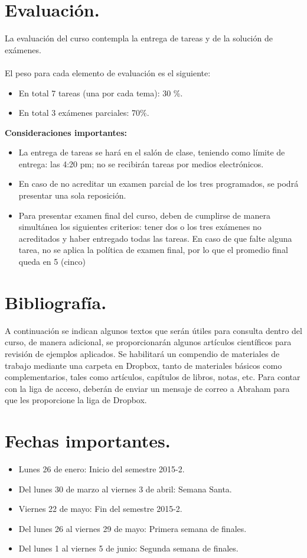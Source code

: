 \documentclass[12pt]{article}
\begin{document}
\section{Evaluación.}
La evaluación del curso contempla la entrega de tareas y de la solución de exámenes.
\\
\\
El peso para cada elemento de evaluación es el siguiente:
\begin{itemize}
\setlength{\itemsep}{0mm}
\item En total 7 tareas (una por cada tema): \hspace{1cm} 30 \%.
\item En total 3 exámenes parciales: \hspace{2.5cm} 70\%.
\end{itemize}
\textbf{Consideraciones importantes:}
\begin{itemize}
\setlength{\itemsep}{0mm}
\item La entrega de tareas se hará en el salón de clase, teniendo como límite de entrega: las 4:20 pm; no se recibirán tareas por medios electrónicos.
\item En caso de no acreditar un examen parcial de los tres programados, se podrá presentar una sola reposición.
\item Para presentar examen final del curso, deben de cumplirse de manera simultánea los siguientes criterios: tener dos o los tres exámenes no acreditados y haber entregado todas las tareas. En caso de que falte alguna tarea, no se aplica la política de examen final, por lo que el promedio final queda en 5 (cinco)
\end{itemize}
\section{Bibliografía.}
A continuación se indican algunos textos que serán útiles para consulta dentro del curso, de manera adicional, se proporcionarán algunos artículos científicos para revisión de ejemplos aplicados. Se habilitará un compendio de materiales de trabajo mediante una carpeta en Dropbox, tanto de materiales básicos como complementarios, tales como artículos, capítulos de libros, notas, etc. Para contar con la liga de acceso, deberán de enviar un mensaje de correo a Abraham para que les proporcione la liga de Dropbox.
\nocite{*}

\section{Fechas importantes.}
\begin{itemize}
\item Lunes 26 de enero: Inicio del semestre 2015-2.
\item Del lunes 30 de marzo al viernes 3 de abril: Semana Santa.
\item Viernes 22 de mayo: Fin del semestre 2015-2.
\item Del lunes 26 al viernes 29 de mayo: Primera semana de finales.
\item Del lunes 1 al viernes 5 de junio: Segunda semana de finales.
\end{itemize}
\end{document}
